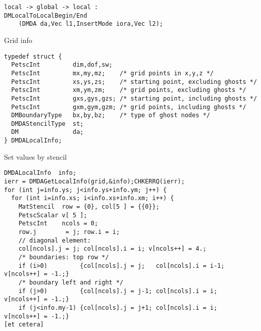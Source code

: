 \begin{longversion}
{\begin{lstlisting}
local -> global -> local :
DMLocalToLocalBegin/End
    (DMDA da,Vec l1,InsertMode iora,Vec l2);
\end{lstlisting}
}




\begin{frame}[containsverbatim]{Grid info}
\begin{lstlisting}
typedef struct {
  PetscInt         dim,dof,sw;
  PetscInt         mx,my,mz;    /* grid points in x,y,z */
  PetscInt         xs,ys,zs;    /* starting point, excluding ghosts */
  PetscInt         xm,ym,zm;    /* grid points, excluding ghosts */
  PetscInt         gxs,gys,gzs; /* starting point, including ghosts */
  PetscInt         gxm,gym,gzm; /* grid points, including ghosts */
  DMBoundaryType   bx,by,bz;    /* type of ghost nodes */
  DMDAStencilType  st;
  DM               da;
} DMDALocalInfo;
\end{lstlisting}
\end{frame}

\begin{frame}[containsverbatim]{Set values by stencil}
\begin{lstlisting}
DMDALocalInfo  info;
ierr = DMDAGetLocalInfo(grid,&info);CHKERRQ(ierr);
for (int j=info.ys; j<info.ys+info.ym; j++) {
  for (int i=info.xs; i<info.xs+info.xm; i++) {
    MatStencil  row = {0}, col[5 ] = {{0}};
    PetscScalar v[ 5 ];
    PetscInt    ncols = 0;
    row.j        = j; row.i = i;
    // diagonal element:
    col[ncols].j = j; col[ncols].i = i; v[ncols++] = 4.;
    /* boundaries: top row */
    if (i>0)         {col[ncols].j = j;   col[ncols].i = i-1; v[ncols++] = -1.;}
    /* boundary left and right */
    if (j>0)         {col[ncols].j = j-1; col[ncols].i = i;   v[ncols++] = -1.;}
    if (j<info.my-1) {col[ncols].j = j+1; col[ncols].i = i;   v[ncols++] = -1.;}
[et cetera]    
\end{lstlisting}
\end{frame}


\end{longversion}
